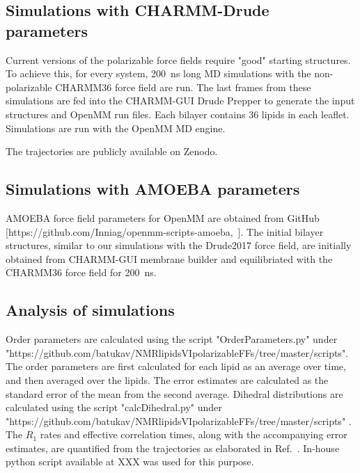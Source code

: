 \documentclass[journal=jacsat,manuscript=article,layout=singlecolumn]{achemso}
\begin{document}
\subsection{Simulations with CHARMM-Drude parameters}





Current versions of the polarizable force fields require "good" starting structures. To achieve this, for every system, 200~ns long MD simulations with the non-polarizable CHARMM36 force field are run. The last frames from these simulations are fed into the CHARMM-GUI Drude Prepper to generate the input structures and OpenMM run files. Each bilayer contains 36 lipids in each leaflet. Simulations are run with the OpenMM MD engine. 

The trajectories are publicly available on Zenodo.

\subsection{Simulations with AMOEBA parameters}


AMOEBA force field parameters for OpenMM are obtained from GitHub [https://github.com/Inniag/openmm-scripts-amoeba,~\cite{klesse2020induced}]. The initial bilayer structures, similar to our simulations with the Drude2017 force field, are initially obtained from CHARMM-GUI membrane builder and equilibriated with the CHARMM36 force field for 200~ns. 

\subsection{Analysis of simulations}
Order parameters are calculated using the script "OrderParameters.py" under\\ "https://github.com/batukav/NMRlipidsVIpolarizableFFs/tree/master/scripts". \\
The order parameters are first calculated for each lipid as an average over time, and then averaged over the lipids. The error estimates are calculated as the standard error of the mean from the second average.
Dihedral distributions are calculated using the script "calcDihedral.py" under\\ "https://github.com/batukav/NMRlipidsVIpolarizableFFs/tree/master/scripts" .\\
The $R_{1}$ rates and effective correlation times, along with the accompanying error estimates, are quantified from the trajectories as elaborated in Ref.~. In-house python script available at XXX was used for this purpose.
\end{document}
